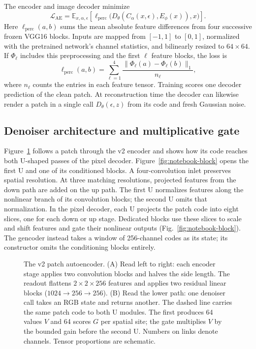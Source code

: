 The encoder and image decoder minimize
\begin{equation}
  \mathcal{L}_{\mathrm{AE}}
  =\mathbb{E}_{x,\alpha,\epsilon}\!\left[
    \ell_{\mathrm{perc}}\bigl(
      D_\theta(C_\alpha(x,\epsilon),E_\phi(x)),x
    \bigr)\right].
  \label{eq:regae-ae-loss}
\end{equation}
Here $\ell_{\mathrm{perc}}(a,b)$ sums the mean absolute feature differences from four successive frozen VGG16 blocks. Inputs are mapped from $[-1,1]$ to $[0,1]$, normalized with the pretrained network's channel statistics, and bilinearly resized to $64\times64$. If $\Phi_\ell$ includes this preprocessing and the first $\ell$ feature blocks, the loss is
\begin{equation}
  \ell_{\mathrm{perc}}(a,b)
  =\sum_{\ell=1}^{4}
    \frac{\|\Phi_\ell(a)-\Phi_\ell(b)\|_1}{n_\ell},
  \label{eq:regae-perceptual-loss}
\end{equation}
where $n_\ell$ counts the entries in each feature tensor. Training scores one decoder prediction of the clean patch. At reconstruction time the decoder can likewise render a patch in a single call $D_\theta(\epsilon,z)$ from its code and fresh Gaussian noise.

\subsection{Denoiser architecture and multiplicative gate}

Figure~\ref{fig:notebook-architecture} follows a patch through the v2 encoder and shows how its code reaches both U-shaped passes of the pixel decoder. Figure~\ref{fig:notebook-block} opens the first U and one of its conditioned blocks. A four-convolution inlet preserves spatial resolution. At three matching resolutions, projected features from the down path are added on the up path. The first U normalizes features along the nonlinear branch of its convolution blocks; the second U omits that normalization. In the pixel decoder, each U projects the patch code into eight slices, one for each down or up stage. Dedicated blocks use these slices to scale and shift features and gate their nonlinear outputs (Fig.~\ref{fig:notebook-block}). The gencoder instead takes a window of 256-channel codes as its state; its constructor omits the conditioning blocks entirely.

\begin{figure}[t]
 \centering
 \resizebox{.99\textwidth}{!}{}
 \caption{The v2 patch autoencoder. (A) Read left to right: each encoder stage applies two convolution blocks and halves the side length. The readout flattens $2\times2\times256$ features and applies two residual linear blocks ($1024\to256\to256$). (B) Read the lower path: one denoiser call takes an RGB state and returns another. The dashed line carries the same patch code to both U modules. The first produces 64 values $V$ and 64 scores $G$ per spatial site; the gate multiplies $V$ by the bounded gain before the second U. Numbers on links denote channels. Tensor proportions are schematic.}
 \label{fig:notebook-architecture}
\end{figure}

